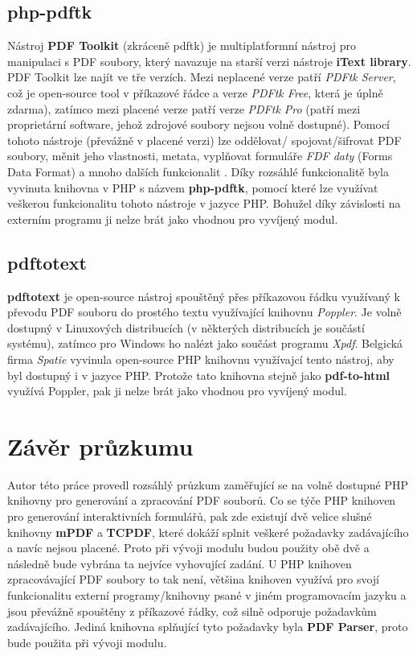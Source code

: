 		\subsection{php-pdftk}
Nástroj \textbf{PDF Toolkit} (zkráceně pdftk) je multiplatformní nástroj pro manipulaci s PDF soubory, který navazuje na starší verzi nástroje \textbf{iText library}. PDF Toolkit lze najít ve tře verzích. Mezi neplacené verze patří \textit{PDFtk Server}, což je open-source tool v příkazové řádce a verze \textit{PDFtk Free}, která je úplně zdarma), zatímco mezi placené verze patří verze \textit{PDFtk Pro} (patří mezi proprietární software, jehož zdrojové soubory nejsou volně dostupné). Pomocí tohoto nástroje (převážně v placené verzi) lze oddělovat/ spojovat/šifrovat PDF soubory, měnit jeho vlastnosti, metata, vyplňovat formuláře \textit{FDF daty} (Forms Data Format) a mnoho dalších funkcionalit \cite{phppdftk}. Díky rozsáhlé funkcionalitě byla vyvinuta knihovna v PHP s názvem \textbf{php-pdftk}, pomocí které lze využívat veškerou funkcionalitu tohoto nástroje v jazyce PHP. Bohužel díky závislosti na externím programu ji nelze brát jako vhodnou pro vyvíjený modul.
		\subsection{pdftotext}
\textbf{pdftotext} je open-source nástroj spouštěný přes příkazovou řádku využívaný k převodu PDF souboru do prostého textu využívající knihovnu \textit{Poppler}. Je volně dostupný v Linuxových distribucích (v některých distribucích je součástí systému), zatímco pro Windows ho nalézt jako součást programu \textit{Xpdf}. Belgická firma \textit{Spatie} vyvinula open-source PHP knihovnu využívajcí tento nástroj, aby byl dostupný i v jazyce PHP. Protože tato knihovna stejně jako \textbf{pdf-to-html} využívá Poppler, pak ji nelze brát jako vhodnou pro vyvíjený modul.
	\section{Závěr průzkumu}
Autor této práce provedl rozsáhlý průzkum zaměřující se na volně dostupné PHP knihovny pro generování a zpracování PDF souborů. Co se týče PHP knihoven pro generování interaktivních formulářů, pak zde existují  dvě velice slušné knihovny \textbf{mPDF} a \textbf{TCPDF}, které dokáží  splnit veškeré požadavky zadávajícího a navíc nejsou placené. Proto při vývoji modulu budou použity obě dvě a následně bude vybrána ta nejvíce vyhovující zadání. U PHP knihoven zpracovávající PDF soubory to tak není, většina knihoven využívá pro svojí funkcionalitu externí programy/knihovny psané v jiném programovacím jazyku a jsou převážně spouštěny z příkazové řádky, což silně odporuje požadavkům zadávajícího. Jediná knihovna splňující tyto požadavky byla \textbf{PDF Parser}, proto bude použita při vývoji modulu. 